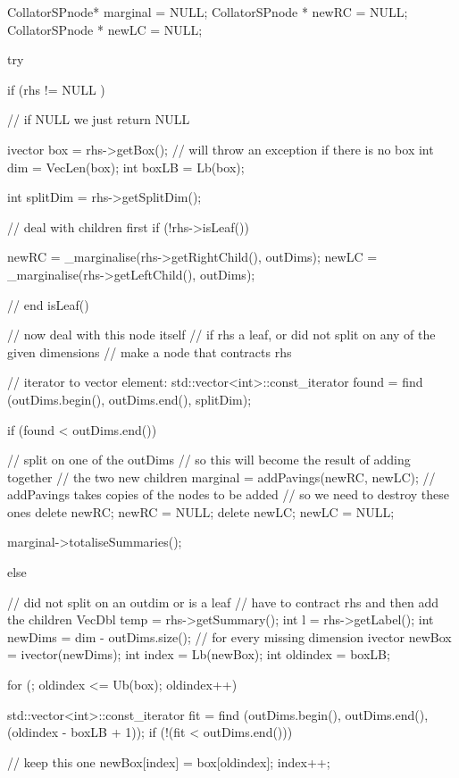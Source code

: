 \begin{DoxyCode}
    {
    CollatorSPnode* marginal = NULL;
    CollatorSPnode * newRC = NULL;
    CollatorSPnode * newLC = NULL;
        
    try {
      
      if (rhs != NULL ) { // if NULL we just return NULL
              
        ivector box = rhs->getBox();
        // will throw an exception if there is no box
        int dim = VecLen(box);
        int boxLB = Lb(box);
        
        int splitDim = rhs->getSplitDim();
        
        // deal with children first
        if (!rhs->isLeaf()) {
                              
          newRC = _marginalise(rhs->getRightChild(), outDims);
          newLC = _marginalise(rhs->getLeftChild(), outDims);
        
        } // end isLeaf()
        
        // now deal with this node itself
        // if rhs a leaf, or did not split on any of the given dimensions
        // make a node that contracts rhs
        
        // iterator to vector element:
        std::vector<int>::const_iterator found 
            = find (outDims.begin(), outDims.end(), splitDim);
        
        if (found < outDims.end()) { // split on one of the outDims
          // so this will become the result of adding together
          // the two new children
          marginal = addPavings(newRC, newLC);
          // addPavings takes copies of the nodes to be added
          // so we need to destroy these ones
          delete newRC;
          newRC = NULL;
          delete newLC;
          newLC = NULL;
          
          marginal->totaliseSummaries(); 
        }
        else { // did not split on an outdim or is a leaf
          // have to contract rhs and then add the children
          VecDbl temp = rhs->getSummary();
          int l = rhs->getLabel();
          int newDims = dim - outDims.size();
          // for every missing dimension
          ivector newBox = ivector(newDims); 
          int index = Lb(newBox);
          int oldindex = boxLB;
          
          for (; oldindex <= Ub(box); oldindex++) {
            std::vector<int>::const_iterator fit 
            = find (outDims.begin(), outDims.end(), (oldindex - boxLB + 1));
            if (!(fit < outDims.end())) { // keep this one
              newBox[index] = box[oldindex];
              index++;
              
}}}}}}
\end{DoxyCode}
